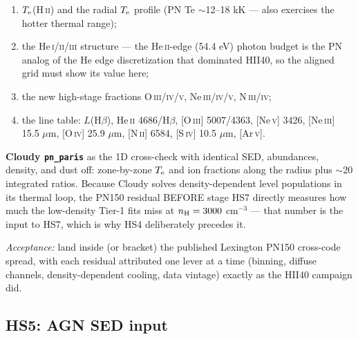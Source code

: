 \documentclass[english,a4paper]{my_memo}
\newcommand{\code}[1]{\texttt{#1}}
\newcommand{\HII}{H\,\textsc{ii}}
\newcommand{\HeII}{He\,\textsc{ii}}
\newcommand{\Te}{T_{\rm e}}
\begin{document}
\begin{enumerate}[leftmargin=2em]
\item $\Te$(\HII{}) and the radial $\Te$ profile (PN Te $\sim$12--18 kK
  --- also exercises the hotter thermal range);
\item the He\,\textsc{i}/\textsc{ii}/\textsc{iii} structure --- the
  \HeII{}-edge (54.4 eV) photon budget is the PN analog of the He edge
  discretization that dominated HII40, so the aligned grid must show
  its value here;
\item the new high-stage fractions O\,\textsc{iii/iv/v},
  Ne\,\textsc{iii/iv/v}, N\,\textsc{iii/iv};
\item the line table: $L$(H$\beta$), \HeII{} 4686/H$\beta$,
  [O\,\textsc{iii}] 5007/4363, [Ne\,\textsc{v}] 3426,
  [Ne\,\textsc{iii}] 15.5 $\mu$m, [O\,\textsc{iv}] 25.9 $\mu$m,
  [N\,\textsc{ii}] 6584, [S\,\textsc{iv}] 10.5 $\mu$m,
  [Ar\,\textsc{v}].
\end{enumerate}

\textbf{Cloudy \code{pn\_paris}} as the 1D cross-check with identical
SED, abundances, density, and dust off: zone-by-zone $\Te$ and ion
fractions along the radius plus $\sim$20 integrated ratios.  Because
Cloudy solves density-dependent level populations in its thermal loop,
the PN150 residual BEFORE stage HS7 directly measures how much the
low-density Tier-1 fits miss at $n_{\rm H}=3000$ cm$^{-3}$ --- that
number is the input to HS7, which is why HS4 deliberately precedes it.

\emph{Acceptance:} land inside (or bracket) the published Lexington
PN150 cross-code spread, with each residual attributed one lever at a
time (binning, diffuse channels, density-dependent cooling, data
vintage) exactly as the HII40 campaign did.

\subsection{HS5: AGN SED input}
\end{document}
